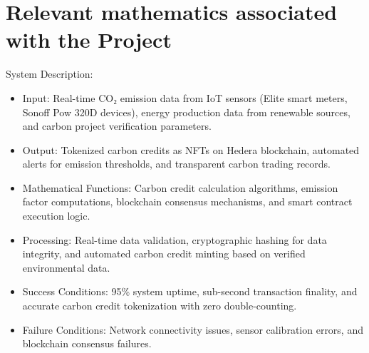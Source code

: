 \documentclass[oneside,a4paper,12pt]{book}
\begin{document}
\section{Relevant mathematics associated with the Project}
\label{sec:math}
System Description:
\begin{itemize} 
\item Input: Real-time CO₂ emission data from IoT sensors (Elite smart meters, Sonoff Pow 320D devices), energy production data from renewable sources, and carbon project verification parameters.
\item Output: Tokenized carbon credits as NFTs on Hedera blockchain, automated alerts for emission thresholds, and transparent carbon trading records.
\item Mathematical Functions: Carbon credit calculation algorithms, emission factor computations, blockchain consensus mechanisms, and smart contract execution logic.
\item Processing: Real-time data validation, cryptographic hashing for data integrity, and automated carbon credit minting based on verified environmental data.
\item Success Conditions: 95\% system uptime, sub-second transaction finality, and accurate carbon credit tokenization with zero double-counting.
\item Failure Conditions: Network connectivity issues, sensor calibration errors, and blockchain consensus failures.		
\end{itemize}
\end{document}
